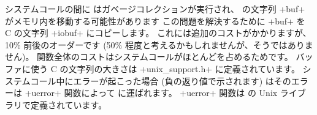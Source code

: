 システムコールの間に \ocaml はガベージコレクションが実行され、
\ocaml の文字列 \ml+buf+ がメモリ内を移動する可能性があります
この問題を解決するために \ml+buf+ を C の文字列 \ml+iobuf+ にコピーします。
これには追加のコストがかかりますが、10\% 前後のオーダーです (50\% 程度と考えるかもしれませんが、そうではありません)。
関数全体のコストはシステムコールがほとんどを占めるためです。
バッファに使う C の文字列の大きさは \ml+unix_support.h+ に定義されています。
システムコール中にエラーが起こった場合 (負の返り値で示されます) はそのエラーは
\ml+uerror+ 関数によって \ocaml に運ばれます。 \ml+uerror+ 関数は \ocaml の Unix ライブラリで定義されています。

